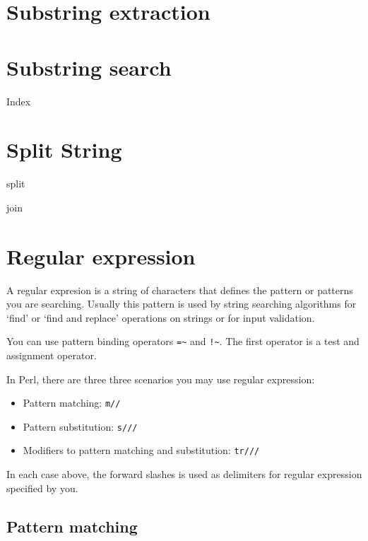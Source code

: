 \documentclass[]{book}
\begin{document}
\hypertarget{substring-extraction}{%
\section{Substring extraction}\label{substring-extraction}}

\hypertarget{substring-search}{%
\section{Substring search}\label{substring-search}}

Index

\hypertarget{split-string}{%
\section{Split String}\label{split-string}}

split

join

\hypertarget{regular-expression}{%
\section{Regular expression}\label{regular-expression}}

A regular expresion is a string of characters that defines the pattern or patterns you are searching. Usually this pattern is used by string searching algorithms for `find' or `find and replace' operations on strings or for input validation.

You can use pattern binding operators \texttt{=\textasciitilde{}} and \texttt{!\textasciitilde{}}. The first operator is a test and assignment operator.

In Perl, there are three three scenarios you may use regular expression:

\begin{itemize}
\item
  Pattern matching: \texttt{m//}
\item
  Pattern substitution: \texttt{s///}
\item
  Modifiers to pattern matching and substitution: \texttt{tr///}
\end{itemize}

In each case above, the forward slashes is used as delimiters for regular expression specified by you.

\hypertarget{pattern-matching}{%
\subsection{Pattern matching}\label{pattern-matching}}
\end{document}

